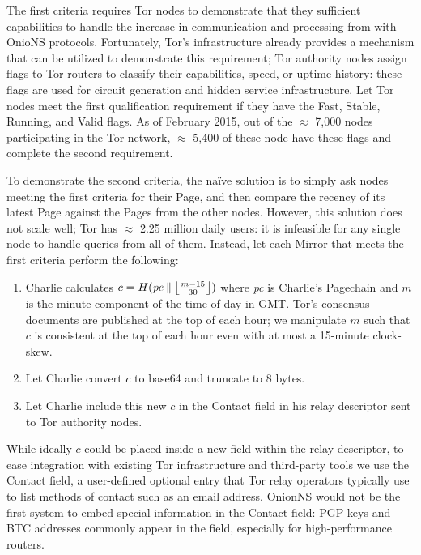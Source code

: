 The first criteria requires Tor nodes to demonstrate that they sufficient capabilities to handle the increase in communication and processing from with OnioNS protocols. Fortunately, Tor's infrastructure already provides a mechanism that can be utilized to demonstrate this requirement; Tor authority nodes assign flags to Tor routers to classify their capabilities, speed, or uptime history: these flags are used for circuit generation and hidden service infrastructure. Let Tor nodes meet the first qualification requirement if they have the Fast, Stable, Running, and Valid flags. As of February 2015, out of the $ \approx $ 7,000 nodes participating in the Tor network, $ \approx $ 5,400 of these node have these flags and complete the second requirement.\cite{TorMetrics}

To demonstrate the second criteria, the na\"{i}ve solution is to simply ask nodes meeting the first criteria for their Page, and then compare the recency of its latest Page against the Pages from the other nodes. However, this solution does not scale well; Tor has $ \approx $ 2.25 million daily users\cite{TorMetrics}: it is infeasible for any single node to handle queries from all of them. Instead, let each Mirror that meets the first criteria perform the following:

\begin{enumerate}
	\item Charlie calculates $ c = H(\mathit{pc} \concat \floor[\big]{\frac{m - 15}{30}}) $ where \emph{pc} is Charlie's Pagechain and $ m $ is the minute component of the time of day in GMT. Tor's consensus documents are published at the top of each hour; we manipulate $ m $ such that $ c $ is consistent at the top of each hour even with at most a 15-minute clock-skew.
	\item Let Charlie convert $ c $ to base64 and truncate to 8 bytes.
	\item Let Charlie include this new $ c $ in the Contact field in his relay descriptor sent to Tor authority nodes.
\end{enumerate}

While ideally $ c $ could be placed inside a new field within the relay descriptor, to ease integration with existing Tor infrastructure and third-party tools we use the Contact field, a user-defined optional entry that Tor relay operators typically use to list methods of contact such as an email address. OnionNS would not be the first system to embed special information in the Contact field: PGP keys and BTC addresses commonly appear in the field, especially for high-performance routers.

